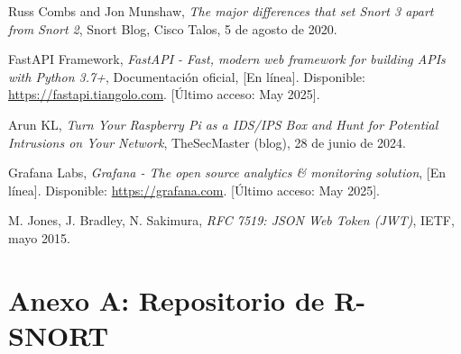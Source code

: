 \documentclass[11pt,a4paper,twoside]{report}
\begin{document}
\begin{thebibliography}{99}
	 Russ Combs and Jon Munshaw, \emph{The major differences that set Snort 3 apart from Snort 2}, Snort Blog, Cisco Talos, 5 de agosto de 2020.
	
	 FastAPI Framework, \emph{FastAPI - Fast, modern web framework for building APIs with Python 3.7+}, Documentación oficial, [En línea]. Disponible: \url{https://fastapi.tiangolo.com}. [Último acceso: May 2025].
	
	 Arun KL, \emph{Turn Your Raspberry Pi as a IDS/IPS Box and Hunt for Potential Intrusions on Your Network}, TheSecMaster (blog), 28 de junio de 2024.
	
	 Grafana Labs, \emph{Grafana - The open source analytics \& monitoring solution}, [En línea]. Disponible: \url{https://grafana.com}. [Último acceso: May 2025].
	
	 M. Jones, J. Bradley, N. Sakimura, \emph{RFC 7519: JSON Web Token (JWT)}, IETF, mayo 2015.
	
\end{thebibliography}

\appendix
\chapter{Anexo A: Repositorio de R-SNORT}


%
\end{document}
